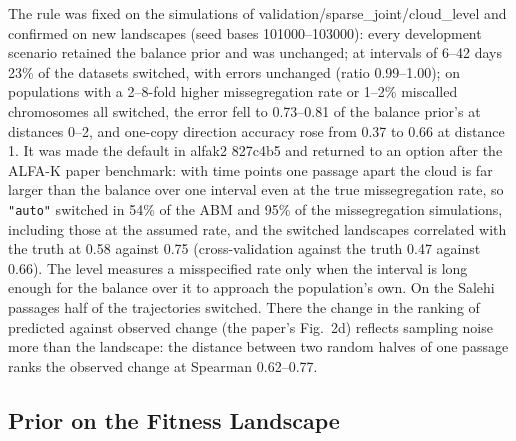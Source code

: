 \documentclass[11pt]{article}
\begin{document}
The rule was fixed on the simulations of validation/sparse\_joint/cloud\_level
and confirmed on new landscapes (seed bases 101000--103000): every
development scenario retained the balance prior and was unchanged; at
intervals of 6--42 days 23\% of the datasets switched, with errors unchanged
(ratio 0.99--1.00); on populations with a 2--8-fold higher missegregation rate
or 1--2\% miscalled chromosomes all switched, the error fell to 0.73--0.81 of
the balance prior's at distances 0--2, and one-copy direction accuracy rose
from 0.37 to 0.66 at distance 1. It was made the default in alfak2 827c4b5
and returned to an option after the ALFA-K paper benchmark: with time points one
passage apart the cloud is far larger than the balance over one interval even
at the true missegregation rate, so \texttt{"auto"} switched in 54\% of the ABM
and 95\% of the missegregation simulations, including those at the assumed
rate, and the switched landscapes correlated with the truth at 0.58 against
0.75 (cross-validation against the truth 0.47 against 0.66). The level
measures a misspecified rate only when the interval is long enough for the
balance over it to approach the population's own. On the Salehi passages half
of the trajectories switched. There the change in the ranking of predicted
against observed change (the paper's Fig.~2d) reflects sampling noise more
than the landscape: the distance between two random halves of one passage
ranks the observed change at Spearman 0.62--0.77.

\subsection{Prior on the Fitness Landscape}
\label{sec:sj-prior}
\end{document}
